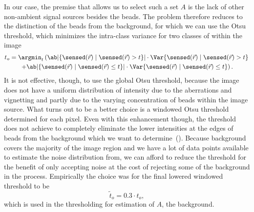 \begin{marginfigure}
    \caption{
        The windowed Otsu threshold leads to lower intensities of some beads to be passed as background. 
        On the left, side, Otsu threshold \(t_o(\vec{r})\) is used for classifying the image pixels into background and 
            foreground by selecting the locations which have a higher intensity than \(t_o(\vec{r})\).
        On the right, the threshold is lowered to \(\tilde{t}_o(\vec{r}) \coloneqq 0.3 \cdot t_o(\vec{r})\) and the same 
            classification is performed.
        At the bottom, difference between rejected pixels by \(t_o\) and accepted by \(\tilde{t}_o\) as foreground are 
            shown.
    }
\end{marginfigure}

In our case, the premise that allows us to select such a set \(A\) is the lack of other non-ambient signal sources 
    besides the beads.
The problem therefore reduces to the distinction of the beads from the background, for which we can use the Otsu 
    threshold, which minimizes the intra-class variance for two classes of within the image
    \begin{multline*}
        t_o = \argmin_{t}\left( \ab|\{\sensed(\vec{r}) \mid \sensed(\vec{r}) > t\}|\cdot\Var\{\sensed(\vec{r}) \mid \sensed(\vec{r})
        > t\}\right. \\
        \left. + \ab|\{\sensed(\vec{r}) \mid \sensed(\vec{r}) \leq t\}| \cdot \Var\{\sensed(\vec{r}) \mid \sensed(\vec{r}) \leq
        t\}\right).
    \end{multline*}
It is not effective, though, to use the global Otsu threshold, because the image does not have a uniform distribution of
    intensity due to the aberrations and vignetting and partly due to the varying concentration of beads within the
    image source.
What turns out to be a better choice is a windowed Otsu threshold determined for each pixel.
Even with this enhancement though, the threshold does not achieve to completely eliminate the lower intensities at the
    edges of beads from the background which we want to determine~().
Because background covers the majority of the image region and we have a lot of data points available to estimate the
    noise distribution from, we can afford to reduce the threshold for the benefit of only accepting noise at the cost 
    of rejecting some of the background in the process.
Empirically the choice was for the final lowered windowed threshold to be
    \begin{equation*}
        \tilde{t}_o = 0.3 \cdot t_o,
    \end{equation*}
    which is used in the thresholding for estimation of \(A\), the background.

